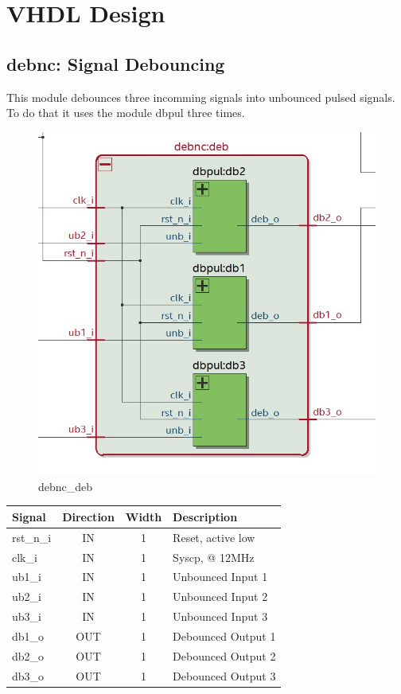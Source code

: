 \documentclass[12pt,a4 paper] {report}
\begin{document}
\newpage

\chapter{VHDL Design}
\section{debnc: Signal Debouncing}
This module debounces three incomming signals into unbounced pulsed signals. To do that it uses the module dbpul 
three times.
\begin{figure}[h]
	\centering	
	\includegraphics[scale=0.3]{../png/debnc_deb.png}
	\caption{debnc\_deb}
\end{figure}
\begin{center}
	\begin{tabular}{ | p{2cm} | c | c | p{5cm} |}
		\hline
		\textbf{Signal} & \textbf{Direction} & \textbf{Width} & \textbf{Description} \\
		\hline
	  rst\_n\_i & IN & 1 & Reset, active low \\
	  \hline
		clk\_i & IN & 1 & Syscp, @ 12MHz \\
		\hline
		ub1\_i & IN & 1 & Unbounced Input 1 \\
		\hline
		ub2\_i & IN & 1 & Unbounced Input 2 \\
		\hline
		ub3\_i & IN & 1 & Unbounced Input 3 \\
		\hline
		db1\_o & OUT & 1 & Debounced Output 1 \\
		\hline
		db2\_o & OUT & 1 & Debounced Output 2 \\
		\hline
		db3\_o & OUT & 1 & Debounced Output 3 \\
		\hline
	\end{tabular}
\end{center}
\end{document}
